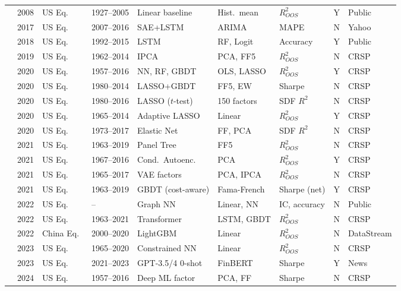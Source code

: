 \begin{longtable}{@{}p{2.4cm} c p{1.0cm} p{1.0cm} p{2.0cm} p{1.9cm} p{1.4cm} c p{1.4cm}@{}}
\citet{Welch2008}      & 2008 & US Eq.  & 1927--2005 & Linear baseline   & Hist.\ mean      & $R^2_{OOS}$  & Y & Public \\
\citet{Bao2017}        & 2017 & US Eq.  & 2007--2016 & SAE+LSTM          & ARIMA            & MAPE         & N & Yahoo \\
\citet{Fischer2018}    & 2018 & US Eq.  & 1992--2015 & LSTM              & RF, Logit        & Accuracy     & Y & Public \\
\citet{Kelly2019}      & 2019 & US Eq.  & 1962--2014 & IPCA              & PCA, FF5         & $R^2_{OOS}$  & N & CRSP \\
\citet{Gu2020}         & 2020 & US Eq.  & 1957--2016 & NN, RF, GBDT      & OLS, LASSO       & $R^2_{OOS}$  & Y & CRSP \\
\citet{DeMiguel2020}   & 2020 & US Eq.  & 1980--2014 & LASSO+GBDT        & FF5, EW          & Sharpe       & N & CRSP \\
\citet{Feng2020}       & 2020 & US Eq.  & 1980--2016 & LASSO ($t$-test)  & 150 factors      & SDF $R^2$    & N & CRSP \\
\citet{Freyberger2020} & 2020 & US Eq.  & 1965--2014 & Adaptive LASSO    & Linear           & $R^2_{OOS}$  & Y & CRSP \\
\citet{Kozak2020}      & 2020 & US Eq.  & 1973--2017 & Elastic Net       & FF, PCA          & SDF $R^2$    & N & CRSP \\
\citet{Cong2021}       & 2021 & US Eq.  & 1963--2019 & Panel Tree        & FF5              & $R^2_{OOS}$  & N & CRSP \\
\citet{Gu2021}         & 2021 & US Eq.  & 1967--2016 & Cond.\ Autoenc.   & PCA              & $R^2_{OOS}$  & Y & CRSP \\
\citet{Kim2021}        & 2021 & US Eq.  & 1965--2017 & VAE factors       & PCA, IPCA        & $R^2_{OOS}$  & N & CRSP \\
\citet{Tobek2021}      & 2021 & US Eq.  & 1963--2019 & GBDT (cost-aware) & Fama-French      & Sharpe (net) & Y & CRSP \\
\citet{Chen2022}       & 2022 & US Eq.  & --         & Graph NN          & Linear, NN       & IC, accuracy & N & Public \\
\citet{Duan2022}       & 2022 & US Eq.  & 1963--2021 & Transformer       & LSTM, GBDT       & $R^2_{OOS}$  & N & CRSP \\
\citet{Leippold2022}   & 2022 & China Eq.\ & 2000--2020 & LightGBM       & Linear           & $R^2_{OOS}$  & N & DataStream \\
\citet{Avramov2023}    & 2023 & US Eq.  & 1965--2020 & Constrained NN    & Linear           & $R^2_{OOS}$  & N & CRSP \\
\citet{LopezLira2023}  & 2023 & US Eq.  & 2021--2023 & GPT-3.5/4 0-shot  & FinBERT          & Sharpe       & Y & News \\
\citet{Chen2024}       & 2024 & US Eq.  & 1957--2016 & Deep ML factor    & PCA, FF          & Sharpe       & N & CRSP \\

\end{longtable}

